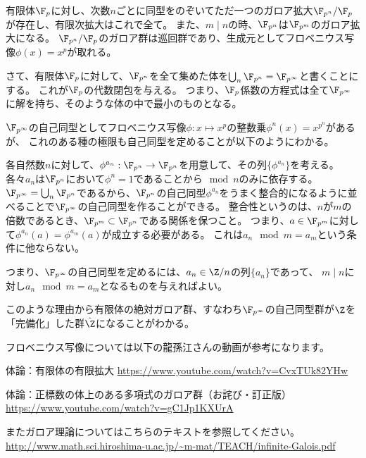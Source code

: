 \documentclass[uplatex]{jsarticle}
\begin{document}
\begin{prop}
  有限体$\F_p$に対し、次数$n$ごとに同型をのぞいてただ一つのガロア拡大$\F_{p^n}/\F_p$が存在し、有限次拡大はこれで全て。
  また、$m\mid n$の時、$\F_{p^n}$は$\F_{p^m}$のガロア拡大になる。
  $\F_{p^n}/\F_p$のガロア群は巡回群であり、生成元としてフロベニウス写像$\phi(x)=x^p$が取れる。
\end{prop}

さて、有限体$\F_p$に対して、$\F_{p^n}$を全て集めた体を$\bigcup_{n}\F_{p^n}=\F_{p^\infty}$と書くことにする。
これが$\F_p$の代数閉包を与える。
つまり、$\F_p$係数の方程式は全て$\F_{p^\infty}$に解を持ち、そのような体の中で最小のものとなる。

$\F_{p^\infty}$の自己同型としてフロベニウス写像$\phi:x\mapsto x^p$の整数乗$\phi^n(x)=x^{p^n}$があるが、
これのある種の極限も自己同型を定めることが以下のようにわかる。

各自然数$n$に対して、$\phi^{a_n}:\F_{p^n}\to\F_{p^n}$を用意して、その列$\{\phi^{a_n}\}$を考える。
各々$a_n$は$\F_{p^n}$において$\phi^n=1$であることから$\mod n$のみに依存する。
$\F_{p^\infty}=\bigcup_n\F_{p^n}$であるから、$\F_{p^n}$の自己同型$\phi^{a_n}$をうまく整合的になるように並べることで$\F_{p^\infty}$の自己同型を作ることができる。
整合性というのは、$n$が$m$の倍数であるとき、$\F_{p^m}\subset\F_{p^n}$である関係を保つこと。
つまり、$a\in\F_{p^m}$に対して$\phi^{a_n}(a)=\phi^{a_m}(a)$が成立する必要がある。
これは$a_n\mod m=a_m$という条件に他ならない。

つまり、$\F_{p^\infty}$の自己同型を定めるには、$a_n\in\Z/n$の列$\{a_n\}$であって、
$m\mid n$に対し$a_n\mod m=a_m$となるものを与えればよい。

このような理由から有限体の絶対ガロア群、すなわち$\F_{p^\infty}$の自己同型群が$\Z$を「完備化」した群$\hat{\Z}$になることがわかる。

フロベニウス写像については以下の龍孫江さんの動画が参考になります。

体論：有限体の有限拡大
\url{https://www.youtube.com/watch?v=CvxTUk82YHw}

体論：正標数の体上のある多項式のガロア群（お詫び・訂正版）
\url{https://www.youtube.com/watch?v=gC1Jp1KXUrA}

またガロア理論についてはこちらのテキストを参照してください。
\url{http://www.math.sci.hiroshima-u.ac.jp/~m-mat/TEACH/infinite-Galois.pdf}
\end{document}
